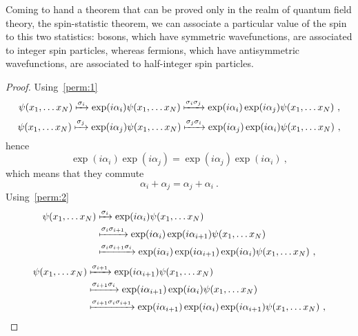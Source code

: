     Coming to hand a theorem that can be proved only in the realm of quantum field theory,  the spin-statistic theorem, we can associate a particular value of the spin to this two statistics: bosons, which have symmetric wavefunctions, are associated to integer spin particles, whereas fermions, which have antisymmetric wavefunctions, are associated to half-integer spin particles.
    \begin{proof}
        Using~\eqref{perm:1}
        \begin{equation*}
            \psi(x_1, \ldots x_N) \xmapsto{\sigma_i} \exp(i \alpha_i) \psi(x_1, \ldots x_N)\xmapsto{\sigma_i \sigma_j} \exp(i \alpha_i) \exp(i \alpha_j) \psi(x_1, \ldots x_N) ~,
        \end{equation*}
        \begin{equation*}
            \psi(x_1, \ldots x_N) \xmapsto{\sigma_j} \exp(i \alpha_j) \psi(x_1, \ldots x_N)\xmapsto{\sigma_j \sigma_i} \exp(i \alpha_j) \exp(i \alpha_i) \psi(x_1, \ldots x_N) ~,
        \end{equation*}
        hence 
        \begin{equation*}
            \exp(i \alpha_i) \exp(i \alpha_j) = \exp(i \alpha_j) \exp(i \alpha_i) ~,
        \end{equation*}
        which means that they commute
        \begin{equation}\label{pr1}
            \alpha_i + \alpha_j = \alpha_j +\alpha_i ~.
        \end{equation}
        Using~\eqref{perm:2}
        \begin{equation*}
        \begin{aligned}
            \psi(x_1, \ldots x_N) & \xmapsto{\sigma_i} \exp(i \alpha_i) \psi(x_1, \ldots x_N) \\ & \xmapsto{\sigma_i \sigma_{i+1}} \exp(i \alpha_i) \exp(i \alpha_{i+1}) \psi(x_1, \ldots x_N) \\ & \xmapsto{\sigma_i \sigma_{i+1} \sigma_i} \exp(i \alpha_i) \exp(i \alpha_{i+1}) \exp(i \alpha_i) \psi(x_1, \ldots x_N) ~,
        \end{aligned}
        \end{equation*}
        \begin{equation*}
        \begin{aligned}
            \psi(x_1, \ldots x_N) & \xmapsto{\sigma_{i+1}} \exp(i \alpha_{i+1}) \psi(x_1, \ldots x_N) \\ & \xmapsto{\sigma_{i+1} \sigma_i} \exp(i \alpha_{i+1}) \exp(i \alpha_i) \psi(x_1, \ldots x_N) \\ & \xmapsto{\sigma_{i+1} \sigma_i \sigma_{i+1} } \exp(i \alpha_{i+1}) \exp(i \alpha_i) \exp(i \alpha_{i+1}) \psi(x_1, \ldots x_N) ~,

\end{aligned}
\end{equation*}
\end{proof}
